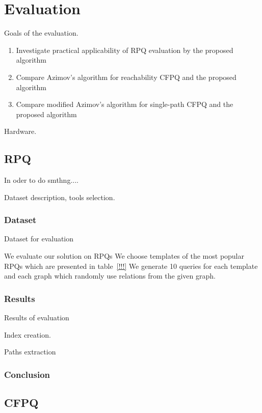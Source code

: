 \section{Evaluation}

Goals of the evaluation.
\begin{enumerate}
	\item Investigate practical applicability of RPQ evaluation by the proposed algorithm
	\item Compare Azimov's algorithm for reachability CFPQ and the proposed algorithm 
	\item Compare modified Azimov's algorithm for single-path CFPQ and the proposed algorithm 
\end{enumerate}

Hardware.

\subsection{RPQ}

In oder to do smthng....

Dataset description, tools selection.

\subsubsection{Dataset}

Dataset for evaluation

We evaluate our solution on RPQs 
We choose templates of the most popular RPQs which are presented in table~\ref{!!!}
We generate 10 queries for each template and each graph which randomly use relations from the given graph.

\subsubsection{Results}

Results of evaluation

Index creation.

Paths extraction

\subsubsection{Conclusion}

\subsection{CFPQ}

